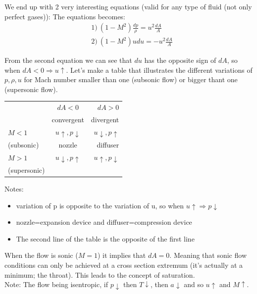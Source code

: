 We end up with 2 very interesting equations (valid for any type of fluid (not only perfect gases)):
The equations becomes:
 \begin{equation}
\begin{aligned}
&1)\ (1-M^2)\frac{dp}{\rho}=u^2\frac{dA}{A} \\
&2)\ (1-M^2)udu=-u^2\frac{dA}{A}
\end{aligned} 
\end{equation}

From the second equation we can see that $du$ has the opposite sign of $dA$, so when $dA<0 \Rightarrow u \uparrow$. Let's make a table that illustrates the different variations of $p,\rho,u$ for Mach number smaller than one (subsonic flow) or bigger thant one (supersonic flow).
\\

\begin{center}
\begin{tabular}{|l|c|r|}
  \hline
   &$dA<0$ & $dA>0$ \\
   &convergent & divergent \\
  \hline
  $M<1$ & $u \uparrow, p \downarrow$ & $u \downarrow, p \uparrow$  \\
  (subsonic) & nozzle & diffuser\\
  \hline
  $M>1$ & $u \downarrow, p \uparrow$ & $u \uparrow, p \downarrow$ \\
  (supersonic) &  & \\
  \hline
\end{tabular}
\end{center}

Notes:
\begin{itemize}
\item variation of p is opposite to the variation of u, so when $u \uparrow \Rightarrow p \downarrow$
\item nozzle=expansion device and diffuser=compression device
\item The second line of the table is the opposite of the first line
\end{itemize}

When the flow is sonic ($M=1$) it implies that $dA=0$. Meaning that sonic flow conditions can only be achieved at a cross section extremum (it's actually at a minimum; the throat). This leads to the concept of saturation.
\\

Note: The flow being isentropic, if $p \downarrow$ then $T \downarrow$, then $a \downarrow$ and so $u \uparrow$ and $M \uparrow$.
\\

